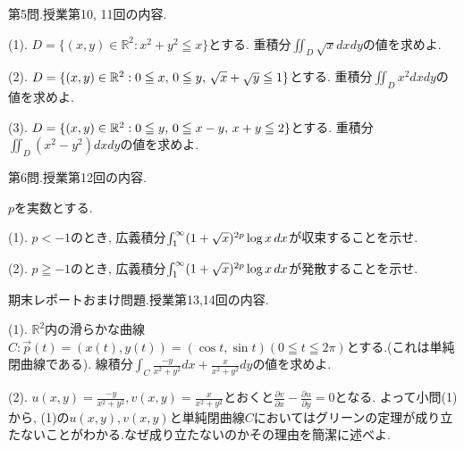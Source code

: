 \documentclass[dvipdfmx,a4paper,11pt]{article}
\newcommand{\R}{\mathbb{R}}
\theoremstyle{definition}
\newcommand{\pdrv}[2]{\frac{\partial #1}{\partial #2}}
\begin{document}
{\Large 第5問.}授業第10, 11回の内容.
\vspace{11pt}

{\large(1). $D=\{ (x,y) \in \R^2 : x^2 + y^2 \leqq x\}$とする.
重積分$\iint_{D} \sqrt{x}dxdy$の値を求めよ.}

\vspace{11pt}
{\large(2). $D=\{ (x,y) \in \R^2 : 0 \leqq x, \text{\,}  0 \leqq y,\text{\,} \sqrt{x} + \sqrt{y} \leqq 1\}$とする.
重積分$\iint_{D} x^2dxdy$の値を求めよ.}

\vspace{11pt}
{\large(3). $D=\{ (x,y) \in \R^2 : 0 \leqq y, \text{\,} 0 \leqq x-y, \text{\,} x+y \leqq 2\}$とする.
重積分$\iint_{D} (x^2-y^2)dxdy$の値を求めよ.}

 \vspace{33pt}
 
 {\Large 第6問.}授業第12回の内容.
\vspace{11pt}

$p$を実数とする.
\vspace{11pt}

{\large(1). $p<-1$のとき, 広義積分$\int_{1}^{\infty} (1+\sqrt{x})^{2p} \log x \text{\,}dx$が収束することを示せ.}

\vspace{11pt}

{\large(2). $p \geqq -1$のとき, 広義積分$\int_{1}^{\infty} (1+\sqrt{x})^{2p} \log x \text{\,}dx$が発散することを示せ.}

 \vspace{33pt}
 

 
{\Large 期末レポートおまけ問題.}授業第13,14回の内容.



\vspace{11pt}

{\large(1). $\R^2$内の滑らかな曲線$C : \vec{p}(t) =(x(t), y(t))=(\cos t, \sin t) (0 \leqq t \leqq 2\pi)$とする.(これは単純閉曲線である). 
線積分$\int_{C} \frac{-y}{x^2 +y^2}dx + \frac{x}{x^2 +y^2} dy$の値を求めよ.}

\vspace{11pt}

{\large(2). $u(x,y)=\frac{-y}{x^2 +y^2}, v(x,y) = \frac{x}{x^2 +y^2} $とおくと$\pdrv{v}{x}-\pdrv{u}{y}=0$となる.
 よって小問(1)から, (1)の$u(x,y),v(x,y)$と単純閉曲線$C$においてはグリーンの定理が成り立たないことがわかる.なぜ成り立たないのかその理由を簡潔に述べよ.}
\end{document}
